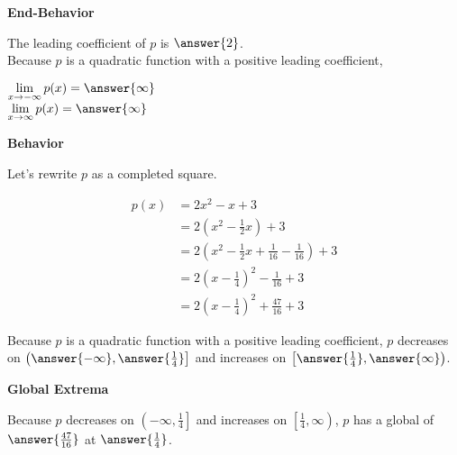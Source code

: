 \documentclass{ximera}
\begin{document}
\begin{exercise}
\begin{question}  \textbf{\textcolor{blue!55!black}{End-Behavior}}


The leading coefficient of $p$ is $\answer{2}$. \\


Because $p$ is a quadratic function with a positive leading coefficient,

$\lim\limits_{x \to -\infty} p(x) = \answer{\infty}$ \\


$\lim\limits_{x \to \infty} p(x) = \answer{\infty}$ \\

\end{question}




\begin{question}  \textbf{\textcolor{blue!55!black}{Behavior}}

Let's rewrite $p$ as a completed square.


\begin{align*}
p(x) & = 2x^2 - x + 3 \\
& = 2 \left( x^2 - \frac{1}{2} x \right) + 3  \\
& = 2 \left( x^2 - \frac{1}{2} x + \frac{1}{16} - \frac{1}{16} \right) + 3  \\
& = 2 \left( x - \frac{1}{4} \right)^2 - \frac{1}{16} + 3  \\
& = 2 \left( x - \frac{1}{4} \right)^2 + \frac{47}{16} + 3  
\end{align*}



Because $p$ is a quadratic function with a positive leading coefficient, $p$ decreases on $\left( \answer{-\infty}, \answer{\frac{1}{4}} \right]$ and increases on $\left[ \answer{\frac{1}{4}}, \answer{\infty} \right)$. 

\end{question}









\begin{question}  \textbf{\textcolor{blue!55!black}{Global Extrema}}

Because $p$ decreases on $\left( -\infty, \frac{1}{4} \right]$ and increases on $\left[ \frac{1}{4}, \infty \right)$, $p$ has a global   of $\answer{\frac{47}{16}}$ at $\answer{\frac{1}{4}}$.




\end{question}
\end{exercise}
\end{document}
